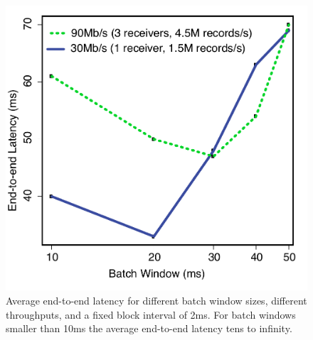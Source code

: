 \begin{figure}[t!]
  \begin{center}
    \includegraphics[scale=0.50]{images_graphs/batchsize_vs_latency/batchsize_vs_latency_illustrator.pdf}
  \end{center}
  \caption{Average end-to-end latency for different batch window sizes, different throughputs, and a fixed block interval of 2ms. For batch windows smaller than 10ms the average end-to-end latency tens to infinity.}
  \label{fig:Batchsize_vs_latency}
\end{figure}

